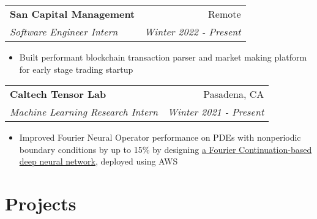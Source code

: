 \documentclass[letterpaper,11pt]{article}
\makeatletter
\newcommand{\resitem}[1]{\item[--] #1}
\newcommand{\ressubheading}[4]{
	\vspace{3pt}
	\begin{tabular*}{7.5in}{l@{\extracolsep{\fill}}r}
			\textbf{#1} & #2 \\
			\textit{#3} & \textit{#4}
	\end{tabular*}
}
\newcommand{\projsubheading}[2]{
	\vspace{3pt}
	\begin{tabular*}{7.5in}{l@{\extracolsep{\fill}}r}
		\textbf{#1} & #2
	\end{tabular*}
}
\makeatother
\begin{document}
\ressubheading{San Capital Management}{Remote}{Software Engineer Intern}
{Winter 2022 - Present}
\begin{itemize}
	\resitem{
		Built performant blockchain transaction parser and market making
		platform for early stage trading startup
	}
\end{itemize}

\ressubheading{Caltech Tensor Lab}
			  {Pasadena, CA}
			  {Machine Learning Research Intern}
			  {Winter 2021 - Present}
\begin{itemize}
	\resitem{
		Improved Fourier Neural Operator performance on PDEs with nonperiodic
		boundary conditions by up to 15\% by designing
		\href{https://symposium.foragerone.com/caltech-sfp-summer-seminar-day-2021/presentations/32348}
			 {a Fourier Continuation-based deep neural network},
		deployed using AWS
	}
\end{itemize}


\section{Projects}

\end{document}
